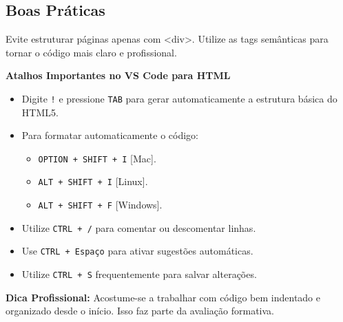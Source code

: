 \documentclass[12pt,a4paper]{article}
\begin{document}
\subsection{Boas Práticas}

Evite estruturar páginas apenas com <div>.  
Utilize as tags semânticas para tornar o código mais claro e profissional.



\begin{boxDica}

\textbf{Atalhos Importantes no VS Code para HTML}

    \begin{itemize}
    \item Digite \texttt{!} e pressione \texttt{TAB} para gerar automaticamente a estrutura básica do HTML5.
    \item Para formatar automaticamente o código: 
    \begin{itemize}
        \item \texttt{OPTION + SHIFT + I} [Mac].
        \item \texttt{ALT + SHIFT + I} [Linux].
        \item \texttt{ALT + SHIFT + F} [Windows].
    \end{itemize}
    \item Utilize \texttt{CTRL + /} para comentar ou descomentar linhas.
    \item Use \texttt{CTRL + Espaço} para ativar sugestões automáticas.
    \item Utilize \texttt{CTRL + S} frequentemente para salvar alterações.
    \end{itemize}
    
    \textbf{Dica Profissional:}  
    Acostume-se a trabalhar com código bem indentado e organizado desde o início. Isso faz parte da avaliação formativa.

\end{boxDica}



\end{document}
